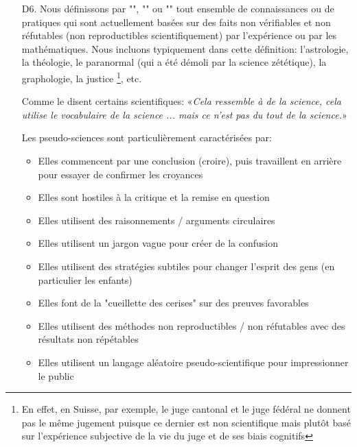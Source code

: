 \begin{itemize}
		\item[D6.] Nous d\'efinissons par "", "" ou "" tout ensemble de connaissances ou de pratiques qui sont actuellement bas\'ees sur des faits non v\'erifiables et non r\'efutables (non reproductibles scientifiquement) par l'exp\'erience ou par les math\'ematiques. Nous incluons typiquement dans cette d\'efinition: l'astrologie, la th\'eologie, le paranormal (qui a \'et\'e d\'emoli par la science z\'et\'etique), la graphologie, la justice \footnote{En effet, en Suisse, par exemple, le juge cantonal et le juge f\'ed\'eral ne donnent pas le même jugement puisque ce dernier est non scientifique mais plutôt bas\'e sur l'exp\'erience subjective de la vie du juge et de ses biais cognitifs}, etc.
		
		Comme le disent certains scientifiques: «\textit{Cela ressemble à de la science, cela utilise le vocabulaire de la science ... mais ce n'est pas du tout de la science.}»
		
		Les pseudo-sciences sont particulièrement caract\'eris\'ees par:
		\begin{itemize}
			\item Elles commencent par une conclusion (croire), puis travaillent en arrière pour essayer de confirmer les croyances
	
			\item Elles sont hostiles à la critique et la remise en question
	
			\item Elles utilisent des raisonnements / arguments circulaires
	
			\item Elles utilisent un jargon vague pour cr\'eer de la confusion
	
			\item Elles utilisent des strat\'egies subtiles pour changer l'esprit des gens (en particulier les enfants)
	
			\item Elles font de la "cueillette des cerises" sur des preuves favorables
	
			\item Elles utilisent des m\'ethodes non reproductibles / non r\'efutables avec des r\'esultats non r\'ep\'etables
	
			\item Elles utilisent un langage al\'eatoire pseudo-scientifique pour impressionner le public
	

\end{itemize}
\end{itemize}
